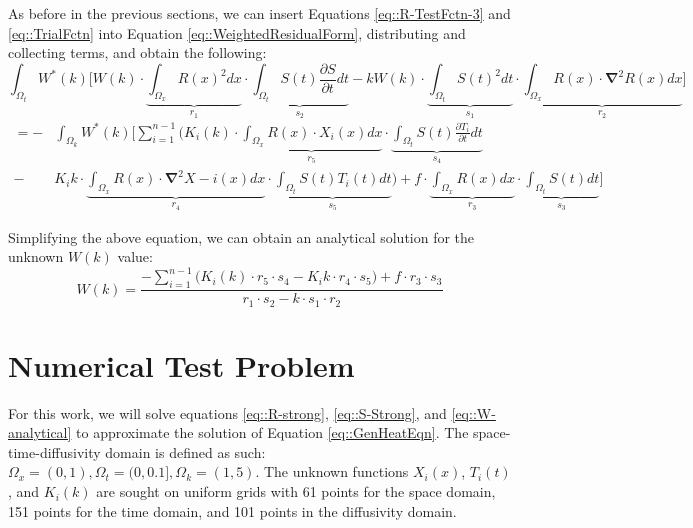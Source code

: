 \documentclass{article}
\def\ds{\displaystyle}
\def\pd{\partial}
\def\grad{\mathbf\nabla}
\begin{document}
As before in the previous sections, we can insert Equations \ref{eq::R-TestFctn-3} and \ref{eq::TrialFctn} into Equation \ref{eq::WeightedResidualForm}, distributing and collecting terms, and obtain the following:
\begin{equation*}
\ds\int_{\Omega_t} W^*(k) \bigg[W(k) \cdot \underbrace{\ds\int_{\Omega_x} R(x)^2 dx}_{r_1} \cdot \underbrace{\ds\int_{\Omega_t} S(t)\frac{\pd S}{\pd t} dt}_{s_2} - kW(k) \cdot \underbrace{\ds\int_{\Omega_t} S(t)^2 dt}_{s_1} \cdot \underbrace{\ds\int_{\Omega_x} R(x)\cdot \grad^2R(x) dx}_{r_2} \bigg] 
\end{equation*}\vspace{-15pt}
\begin{align}
=  -& \ds\int_{\Omega_k} W^*(k) \Bigg[\ds\sum_{i=1}^{n-1} \bigg( K_i(k) \cdot \underbrace{\ds\int_{\Omega_x} R(x)\cdot X_i(x) dx}_{r_5} \cdot \underbrace{\ds\int_{\Omega_t} S(t) \frac{\pd T_i}{\pd t} dt}_{s_4} \nonumber\\
- & K_i k \cdot \underbrace{\ds\int_{\Omega_x} R(x)\cdot \grad^2 X-i(x)dx}_{r_4} \cdot \underbrace{\ds\int_{\Omega_t} S(t)T_i(t)dt}_{s_5}\bigg) + f\cdot \underbrace{\ds\int_{\Omega_x} R(x) dx }_{r_3} \cdot \underbrace{\ds\int_{\Omega_t}S(t)dt}_{s_3} \Bigg]
\end{align}

Simplifying the above equation, we can obtain an analytical solution for the unknown $W(k)$ value:
\begin{equation}
\label{eq::W-analytical}
W(k) =  \frac{-\ds\sum_{i=1}^{n-1} \bigg( K_i(k) \cdot r_5 \cdot s_4 -  K_i k \cdot r_4 \cdot s_5\bigg) + f\cdot r_3 \cdot s_3}{r_1 \cdot s_2 - k \cdot s_1 \cdot r_2}
\end{equation}

\section{Numerical Test Problem}
For this work, we will solve equations \ref{eq::R-strong}, \ref{eq::S-Strong}, and \ref{eq::W-analytical} to approximate the solution of Equation \ref{eq::GenHeatEqn}. The space-time-diffusivity domain is defined as such: $\Omega_x = (0,1), \Omega_t = (0,0.1], \Omega_k = (1,5)$. The unknown functions $X_i(x)$, $T_i(t)$, and $K_i(k)$ are sought on uniform grids with 61 points for the space domain, 151 points for the time domain, and 101 points in the diffusivity domain. 
\end{document}
